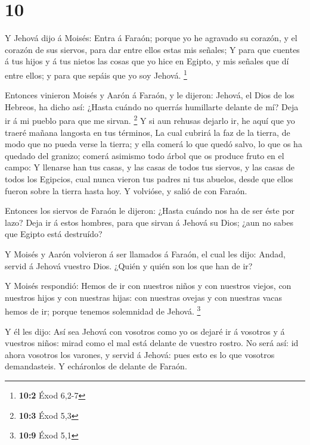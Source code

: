 \hypertarget{section-9}{%
\section{10}\label{section-9}}

 Y Jehová dijo á Moisés: Entra á Faraón; porque yo he
agravado su corazón, y el corazón de sus siervos, para dar entre ellos
estas mis señales;  Y para que cuentes á tus hijos y á tus
nietos las cosas que yo hice en Egipto, y mis señales que dí entre
ellos; y para que sepáis que yo soy Jehová. \footnote{\textbf{10:2} Éxod
  6,2-7}

 Entonces vinieron Moisés y Aarón á Faraón, y le dijeron:
Jehová, el Dios de los Hebreos, ha dicho así: ¿Hasta cuándo no querrás
humillarte delante de mí? Deja ir á mi pueblo para que me sirvan.
\footnote{\textbf{10:3} Éxod 5,3}  Y si aun rehusas
dejarlo ir, he aquí que yo traeré mañana langosta en tus términos,
 La cual cubrirá la faz de la tierra, de modo que no pueda
verse la tierra; y ella comerá lo que quedó salvo, lo que os ha quedado
del granizo; comerá asimismo todo árbol que os produce fruto en el
campo:  Y llenarse han tus casas, y las casas de todos tus
siervos, y las casas de todos los Egipcios, cual nunca vieron tus padres
ni tus abuelos, desde que ellos fueron sobre la tierra hasta hoy. Y
volvióse, y salió de con Faraón.

 Entonces los siervos de Faraón le dijeron: ¿Hasta cuándo
nos ha de ser éste por lazo? Deja ir á estos hombres, para que sirvan á
Jehová su Dios; ¿aun no sabes que Egipto está destruído?

 Y Moisés y Aarón volvieron á ser llamados á Faraón, el
cual les dijo: Andad, servid á Jehová vuestro Dios. ¿Quién y quién son
los que han de ir?

 Y Moisés respondió: Hemos de ir con nuestros niños y con
nuestros viejos, con nuestros hijos y con nuestras hijas: con nuestras
ovejas y con nuestras vacas hemos de ir; porque tenemos solemnidad de
Jehová. \footnote{\textbf{10:9} Éxod 5,1}

 Y él les dijo: Así sea Jehová con vosotros como yo os
dejaré ir á vosotros y á vuestros niños: mirad como el mal está delante
de vuestro rostro.  No será así: id ahora vosotros los
varones, y servid á Jehová: pues esto es lo que vosotros demandasteis. Y
echáronlos de delante de Faraón.

